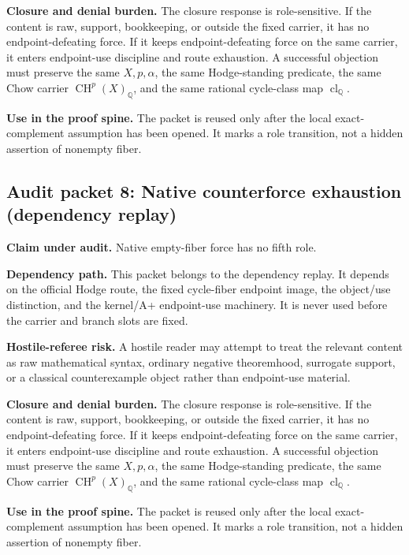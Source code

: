 \documentclass[11pt]{article}
\newcommand{\QQ}{\mathbb{Q}}
\newcommand{\CH}{\operatorname{CH}}
\newcommand{\clQ}{\operatorname{cl}_{\QQ}}
\begin{document}
\par\noindent\textbf{Closure and denial burden.} The closure response is role-sensitive. If the content is raw, support, bookkeeping, or outside the fixed carrier, it has no endpoint-defeating force. If it keeps endpoint-defeating force on the same carrier, it enters endpoint-use discipline and route exhaustion. A successful objection must preserve the same $X,p,\alpha$, the same Hodge-standing predicate, the same Chow carrier $\CH^p(X)_\QQ$, and the same rational cycle-class map $\clQ$.


\par\noindent\textbf{Use in the proof spine.} The packet is reused only after the local exact-complement assumption has been opened. It marks a role transition, not a hidden assertion of nonempty fiber.


\subsection{Audit packet 8: Native counterforce exhaustion (dependency replay)}


\par\noindent\textbf{Claim under audit.} Native empty-fiber force has no fifth role.


\par\noindent\textbf{Dependency path.} This packet belongs to the dependency replay. It depends on the official Hodge route, the fixed cycle-fiber endpoint image, the object/use distinction, and the kernel/A+ endpoint-use machinery. It is never used before the carrier and branch slots are fixed.


\par\noindent\textbf{Hostile-referee risk.} A hostile reader may attempt to treat the relevant content as raw mathematical syntax, ordinary negative theoremhood, surrogate support, or a classical counterexample object rather than endpoint-use material.


\par\noindent\textbf{Closure and denial burden.} The closure response is role-sensitive. If the content is raw, support, bookkeeping, or outside the fixed carrier, it has no endpoint-defeating force. If it keeps endpoint-defeating force on the same carrier, it enters endpoint-use discipline and route exhaustion. A successful objection must preserve the same $X,p,\alpha$, the same Hodge-standing predicate, the same Chow carrier $\CH^p(X)_\QQ$, and the same rational cycle-class map $\clQ$.


\par\noindent\textbf{Use in the proof spine.} The packet is reused only after the local exact-complement assumption has been opened. It marks a role transition, not a hidden assertion of nonempty fiber.
\end{document}
